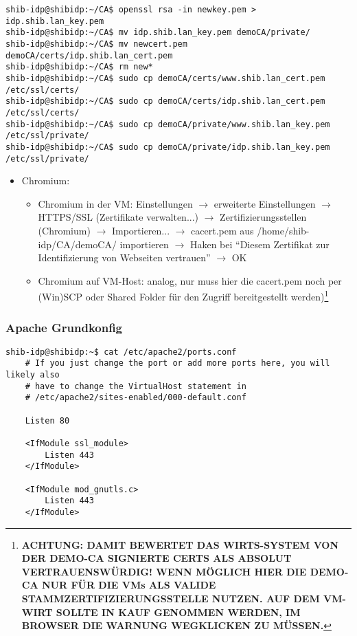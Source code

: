 \begin{lstlisting}
shib-idp@shibidp:~/CA$ openssl rsa -in newkey.pem > idp.shib.lan_key.pem
shib-idp@shibidp:~/CA$ mv idp.shib.lan_key.pem demoCA/private/
shib-idp@shibidp:~/CA$ mv newcert.pem demoCA/certs/idp.shib.lan_cert.pem
shib-idp@shibidp:~/CA$ rm new*
shib-idp@shibidp:~/CA$ sudo cp demoCA/certs/www.shib.lan_cert.pem /etc/ssl/certs/
shib-idp@shibidp:~/CA$ sudo cp demoCA/certs/idp.shib.lan_cert.pem /etc/ssl/certs/
shib-idp@shibidp:~/CA$ sudo cp demoCA/private/www.shib.lan_key.pem /etc/ssl/private/
shib-idp@shibidp:~/CA$ sudo cp demoCA/private/idp.shib.lan_key.pem
/etc/ssl/private/
\end{lstlisting}

\begin{itemize}
  \item Chromium:
  \begin{itemize}
    \item  Chromium in der VM: Einstellungen $\rightarrow$
  erweiterte Einstellungen $\rightarrow$ HTTPS/SSL (Zertifikate verwalten...) $\rightarrow$ Zertifizierungsstellen (Chromium) $\rightarrow$ Importieren... $\rightarrow$ cacert.pem aus /home/shib-idp/CA/demoCA/ importieren $\rightarrow$ Haken bei "`Diesem Zertifikat zur Identifizierung von Webseiten vertrauen"' $\rightarrow$ OK
  \item  Chromium auf VM-Host: analog, nur muss hier die cacert.pem noch per
  (Win)SCP oder Shared Folder für den Zugriff bereitgestellt
  werden)\footnote{\textbf{{\color{red} ACHTUNG:} DAMIT BEWERTET DAS
  WIRTS-SYSTEM VON DER DEMO-CA SIGNIERTE CERTS ALS ABSOLUT VERTRAUENSWÜRDIG! WENN MÖGLICH
  HIER DIE DEMO-CA NUR FÜR DIE VMs ALS VALIDE STAMMZERTIFIZIERUNGSSTELLE
  NUTZEN.
  AUF DEM VM-WIRT SOLLTE IN KAUF GENOMMEN WERDEN, IM BROWSER DIE WARNUNG
  WEGKLICKEN ZU MÜSSEN.}}
  \end{itemize}
\end{itemize}


\subsubsection{Apache Grundkonfig}
\begin{lstlisting}
shib-idp@shibidp:~$ cat /etc/apache2/ports.conf
	# If you just change the port or add more ports here, you will likely also
	# have to change the VirtualHost statement in
	# /etc/apache2/sites-enabled/000-default.conf

	Listen 80

	<IfModule ssl_module>
		Listen 443
	</IfModule>

	<IfModule mod_gnutls.c>
		Listen 443
	</IfModule>
\end{lstlisting}

